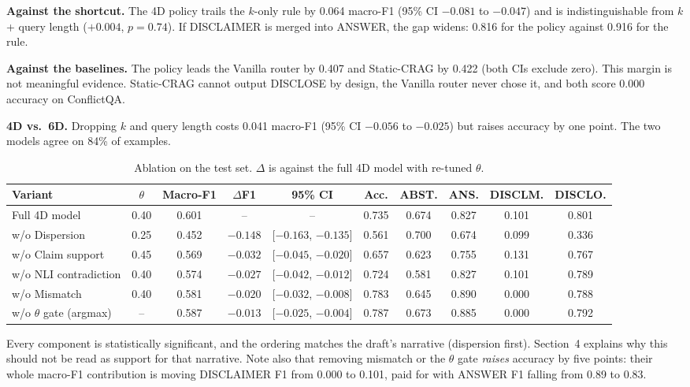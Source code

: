 \documentclass[10pt,a4paper]{article}
\begin{document}
\textbf{Against the shortcut.} The 4D policy trails the $k$-only rule by 0.064 macro-F1
(95\% CI $-0.081$ to $-0.047$) and is indistinguishable from $k$ + query length
($+0.004$, $p{=}0.74$). If DISCLAIMER is merged into ANSWER, the gap widens: 0.816 for the policy
against 0.916 for the rule.

\textbf{Against the baselines.} The policy leads the Vanilla router by 0.407 and Static-CRAG by
0.422 (both CIs exclude zero). This margin is not meaningful evidence. Static-CRAG cannot output
DISCLOSE by design, the Vanilla router never chose it, and both score 0.000 accuracy on ConflictQA.

\textbf{4D vs.\ 6D.} Dropping $k$ and query length costs 0.041 macro-F1
(95\% CI $-0.056$ to $-0.025$) but raises accuracy by one point. The two models agree on 84\% of
examples.

\begin{table}[h]
\centering\small
\caption{Ablation on the test set. $\Delta$ is against the full 4D model with re-tuned $\theta$.}
\begin{tabular}{lccccccccc}
\toprule
Variant & $\theta$ & Macro-F1 & $\Delta$F1 & 95\% CI & Acc. & ABST. & ANS. & DISCLM. & DISCLO. \\
\midrule
Full 4D model & 0.40 & 0.601 & -- & -- & 0.735 & 0.674 & 0.827 & 0.101 & 0.801 \\
w/o Dispersion & 0.25 & 0.452 & $-0.148$ & [$-0.163$, $-0.135$] & 0.561 & 0.700 & 0.674 & 0.099 & 0.336 \\
w/o Claim support & 0.45 & 0.569 & $-0.032$ & [$-0.045$, $-0.020$] & 0.657 & 0.623 & 0.755 & 0.131 & 0.767 \\
w/o NLI contradiction & 0.40 & 0.574 & $-0.027$ & [$-0.042$, $-0.012$] & 0.724 & 0.581 & 0.827 & 0.101 & 0.789 \\
w/o Mismatch & 0.40 & 0.581 & $-0.020$ & [$-0.032$, $-0.008$] & 0.783 & 0.645 & 0.890 & 0.000 & 0.788 \\
w/o $\theta$ gate (argmax) & -- & 0.587 & $-0.013$ & [$-0.025$, $-0.004$] & 0.787 & 0.673 & 0.885 & 0.000 & 0.792 \\
\bottomrule
\end{tabular}
\end{table}

Every component is statistically significant, and the ordering matches the draft's narrative
(dispersion first). Section~4 explains why this should not be read as support for that narrative.
Note also that removing mismatch or the $\theta$ gate \emph{raises} accuracy by five points:
their whole macro-F1 contribution is moving DISCLAIMER F1 from 0.000 to 0.101, paid for with
ANSWER F1 falling from 0.89 to 0.83.
\end{document}
